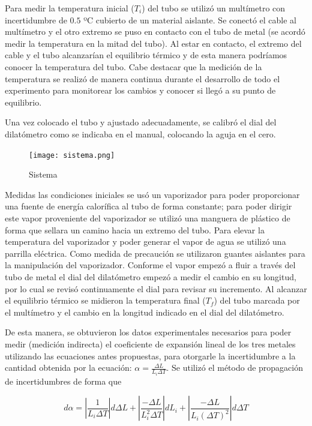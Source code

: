 \documentclass[a4paper]{article}
\begin{document}
Para medir la temperatura inicial ($T_i$) del tubo se utilizó un multímetro con incertidumbre de $0.5$ ºC cubierto de un material aislante. Se conectó el cable al multímetro y el otro extremo se puso en contacto con el tubo de metal (se acordó medir la temperatura en la mitad del tubo).  Al estar en contacto, el extremo del cable y el tubo alcanzarían el equilibrio térmico y de esta manera podríamos conocer la temperatura del tubo. Cabe destacar que la medición de la temperatura se realizó de manera continua durante el desarrollo de todo el experimento para monitorear los cambios y conocer si llegó a su punto de equilibrio.

Una vez colocado el tubo y ajustado adecuadamente, se calibró el dial del dilatómetro como se indicaba en el manual, colocando la aguja en el cero.

\begin{figure}[H]
\texttt{[image: sistema.png]}
\centering
\caption{Sistema}
\centering
\end{figure}

Medidas las condiciones iniciales se usó un vaporizador para poder proporcionar una fuente de energía calorífica al tubo de forma constante; para poder dirigir este vapor proveniente del vaporizador se utilizó una manguera de plástico de forma que sellara un camino hacia un extremo del tubo. Para elevar la temperatura del vaporizador y poder generar el vapor de agua se utilizó una parrilla eléctrica. Como medida de precaución se utilizaron guantes aislantes para la manipulación del vaporizador. Conforme el vapor empezó a fluir a través del tubo de metal el dial del dilatómetro empezó a medir el cambio en su longitud, por lo cual se revisó continuamente el dial para revisar su incremento. Al alcanzar el equilibrio térmico se midieron la temperatura final ($T_f$) del tubo marcada por el multímetro y el cambio en la longitud indicado en el dial del dilatómetro.

De esta manera, se obtuvieron los datos experimentales necesarios para poder medir (medición indirecta) el coeficiente de expansión lineal de los tres metales utilizando las ecuaciones antes propuestas, para otorgarle la incertidumbre a la cantidad obtenida por la ecuación: $\alpha = \frac{\Delta L}{L_i \Delta T}$. Se utilizó el método de propagación de incertidumbres de forma que

$$d\alpha = \left|\frac{1}{L_i \Delta T} \right|d\Delta L +  \left|\frac{-\Delta L}{L^2_i \Delta T} \right|d L_i + \left|\frac{-\Delta L}{L_i (\Delta T)^2} \right|d\Delta T $$
\end{document}
